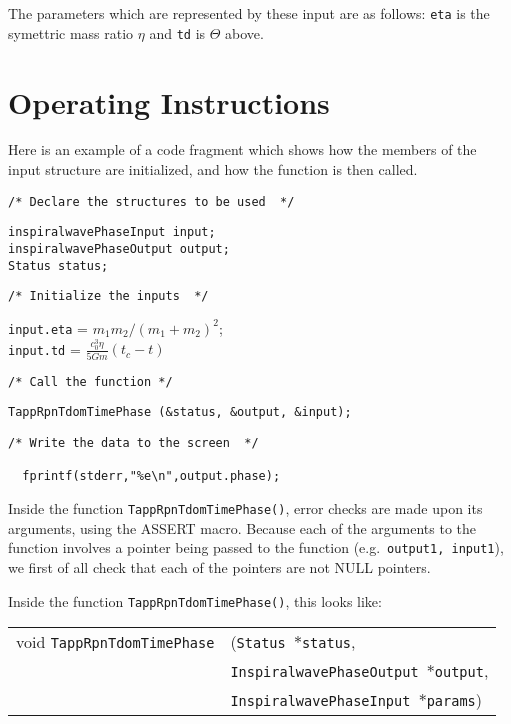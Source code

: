 \documentclass[12pt]{article}
\begin{document}
The parameters which are represented by these input are as follows: \texttt{eta} is the symettric mass ratio $\eta$ and \texttt{td} is $\Theta$ above. 



\section{Operating Instructions}

Here is an example of a code fragment which shows how the members of the input structure are initialized, and how the function is then called.

\vspace{5mm}

\noindent
\begin{verbatim}
/* Declare the structures to be used  */
\end{verbatim}
\texttt{inspiralwavePhaseInput input;} \\
\texttt{inspiralwavePhaseOutput output;} \\
\texttt{Status status;} \\
\begin{verbatim}
/* Initialize the inputs  */
\end{verbatim}
\texttt{input.eta} = $m_{1}m_{2}/(m_{1}+m_{2})^{2}$; \\
\texttt{input.td} = $\frac{c^{3}_{0} \eta}{5Gm} (t_{c} - t)$\\
\begin{verbatim}
/* Call the function */
\end{verbatim}
\texttt{TappRpnTdomTimePhase (\&status, \&output, \&input);}
\begin{verbatim}
/* Write the data to the screen  */

  fprintf(stderr,"%e\n",output.phase); 
\end{verbatim}

Inside the function \texttt{TappRpnTdomTimePhase()}, error checks are made upon its arguments, using the ASSERT macro. Because each of the arguments to the function involves a pointer being passed to the function (e.g.\ \texttt{output1, input1}), we first of all check that each of the pointers are not NULL pointers.

Inside the function \texttt{TappRpnTdomTimePhase()}, this looks like:

\vspace{5mm}

\begin{tabular}{ll}
void \texttt{TappRpnTdomTimePhase}&(\texttt{Status $\ast$status},     \\
                                   &\texttt{InspiralwavePhaseOutput $\ast$output}, \\
                                   &\texttt{InspiralwavePhaseInput $\ast$params})
\end{tabular}
\end{document}
